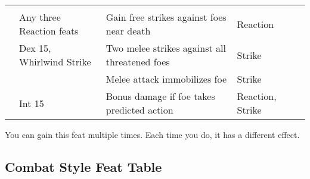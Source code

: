\begin{longtabuwrapper}
\begin{longtabu}{>{\lcol}p{10em} >{\lcol}p{15em} >{\lcol}X >{\lcol}p{8em} >{\lcol}p{3em}}
        \midrule
         &  &  &  &  \\
         & Any three Reaction feats & Gain free strikes against foes near death & Reaction &  \\
         & Dex 15, Whirlwind Strike & Two melee strikes against all threatened foes & Strike &  \\
         & \x & Melee attack immobilizes foe & Strike &  \\
         & Int 15 & Bonus damage if foe takes predicted action & Reaction, Strike &  \\
    \end{longtabu}
    \begin{enumerate*}
        \item You can gain this feat multiple times.
            Each time you do, it has a different effect.
    \end{enumerate*}
\end{longtabuwrapper}

\subsection{Combat Style Feat Table}

